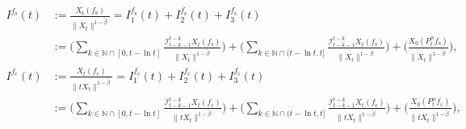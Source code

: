 \documentclass[12pt,a4paper]{amsart}
\theoremstyle{plain}
\theoremstyle{definition}
\numberwithin{equation}{section}
\begin{document}
  \begin{align} 
   I^{f_\mathrm s}(t) &:= \frac{X_t(f_\mathrm s)}{\|X_t\|^{1- \tilde \beta }}  = I^{f_\mathrm s}_1(t) + I^{f_\mathrm s}_2(t) + I^{f_\mathrm s}_3(t)
    \\&:=  \Big(\sum_{k\in \mathbb N \cap [0,t-\ln t]}  \frac{\mathcal I_{t-k-1}^{t-k} X_t(f_\mathrm s)}{\|X_t\|^{1-\tilde \beta} } \Big) + \Big(\sum_{k\in\mathbb{N}\cap(t-\ln t, t]} \frac{\mathcal I_{t-k-1}^{t-k} X_t(f_\mathrm s)}{\|X_t\|^{1-\tilde \beta}}  \Big)
   + \Big( \frac{X_0(P_t^\alpha f_\mathrm s)}{\|X_t\|^{1-\tilde \beta}}\Big),
    \\ I^{f_\mathrm c}(t)&:=\frac{X_t(f_\mathrm c)}{\|tX_t\|^{1-\tilde \beta}} = I^{f_\mathrm c}_1(t) + I^{f_\mathrm c}_2(t) + I^{f_\mathrm c}_3(t)
        \\&:=  \Big(\sum_{k\in \mathbb N \cap [0,t-\ln t]}  \frac{\mathcal I_{t-k-1}^{t-k} X_t(f_\mathrm c)}{\|tX_t\|^{1-\tilde \beta} } \Big) + \Big(\sum_{k\in\mathbb{N}\cap(t-\ln t, t]} \frac{\mathcal I_{t-k-1}^{t-k} X_t(f_\mathrm c)}{\|tX_t\|^{1-\tilde \beta}}  \Big)    + \Big( \frac{X_0(P_t^\alpha f_\mathrm c)}{\|tX_t\|^{1-\tilde \beta}}\Big),

\end{align}
\end{document}
